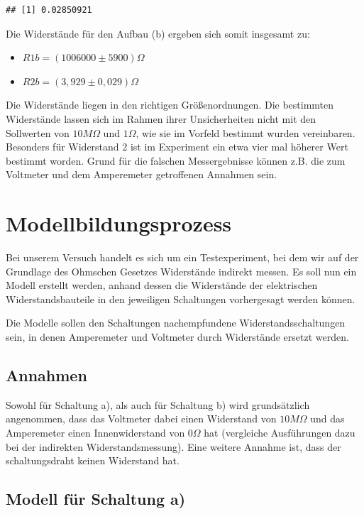 \documentclass[
  9pt,
]{article}
\begin{document}
\begin{verbatim}
## [1] 0.02850921
\end{verbatim}

Die Widerstände für den Aufbau (b) ergeben sich somit insgesamt zu:

\begin{itemize}
\item $R1b = (1006000\pm 5900)\Omega $
\item $R2b = (3,929\pm 0,029) \Omega$
\end{itemize}

Die Widerstände liegen in den richtigen Größenordnungen. Die bestimmten
Widerstände lassen sich im Rahmen ihrer Unsicherheiten nicht mit den
Sollwerten von \(10M\Omega\) und \(1\Omega\), wie sie im Vorfeld
bestimmt wurden vereinbaren. Besonders für Widerstand 2 ist im
Experiment ein etwa vier mal höherer Wert bestimmt worden. Grund für die
falschen Messergebnisse können z.B. die zum Voltmeter und dem
Amperemeter getroffenen Annahmen sein.

\hypertarget{modellbildungsprozess}{%
\section{Modellbildungsprozess}\label{modellbildungsprozess}}

Bei unserem Versuch handelt es sich um ein Testexperiment, bei dem wir
auf der Grundlage des Ohmschen Gesetzes Widerstände indirekt messen. Es
soll nun ein Modell erstellt werden, anhand dessen die Widerstände der
elektrischen Widerstandsbauteile in den jeweiligen Schaltungen
vorhergesagt werden können.

Die Modelle sollen den Schaltungen nachempfundene Widerstandsschaltungen
sein, in denen Amperemeter und Voltmeter durch Widerstände ersetzt
werden.

\hypertarget{annahmen}{%
\subsection{Annahmen}\label{annahmen}}

Sowohl für Schaltung a), als auch für Schaltung b) wird grundsätzlich
angenommen, dass das Voltmeter dabei einen Widerstand von \(10M\Omega\)
und das Amperemeter einen Innenwiderstand von \(0\Omega\) hat
(vergleiche Ausführungen dazu bei der indirekten Widerstandsmessung).
Eine weitere Annahme ist, dass der schaltungsdraht keinen Widerstand
hat.

\hypertarget{modell-fuxfcr-schaltung-a}{%
\subsection{Modell für Schaltung a)}\label{modell-fuxfcr-schaltung-a}}
\end{document}
